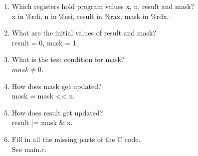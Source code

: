 \documentclass{article}
\begin{document}
\begin{enumerate}[label=\textbf{\Alph*.}]
	\item Which registers hold program values x, n, result and mask? \\
	x in \%rdi, n in \%esi, result in \%rax, mask in \%rdx.
	\item What are the initial values of result and mask? \\
	result = 0, mask = 1.
	\item What is the test condition for mask? \\
	$mask \neq 0$.
	\item How does mask get updated? \\
	mask = mask << n.
	\item How does result get updated? \\
	result |= mask \& x.
	\item Fill in all the missing parts of the C code. \\
	See main.c.
\end{enumerate}
\end{document}
